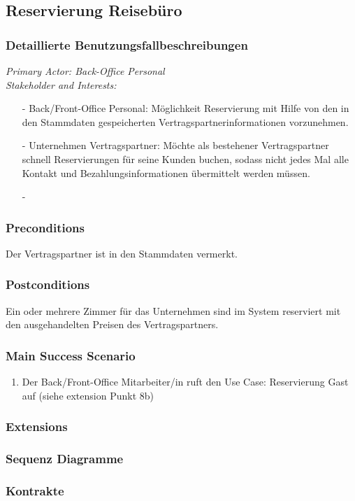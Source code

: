 \documentclass[./detailed_overview_usecases.tex]{subfiles}
\begin{document}
    \subsection{Reservierung Reisebüro}
    \subsubsection{Detaillierte Benutzungsfallbeschreibungen}

    \textit{Primary Actor: Back-Office Personal}
    \\
    \textit{Stakeholder and Interests:}
    \begin{itemize}
        \item[-] Back/Front-Office Personal: Möglichkeit Reservierung mit Hilfe von den in den Stammdaten gespeicherten Vertragspartnerinformationen vorzunehmen.
        \item[-] Unternehmen Vertragspartner: Möchte als bestehener Vertragspartner schnell Reservierungen für seine Kunden buchen, sodass nicht jedes
        Mal alle Kontakt und Bezahlungsinformationen übermittelt werden müssen.
        \item[-]
    \end{itemize}

    \subsubsection*{Preconditions}
    Der Vertragspartner ist in den Stammdaten vermerkt.

    \subsubsection*{Postconditions}
    Ein oder mehrere Zimmer für das Unternehmen sind im System reserviert mit den ausgehandelten Preisen des Vertragspartners.

    \subsubsection*{Main Success Scenario}
    \begin{enumerate}
        \item Der Back/Front-Office Mitarbeiter/in ruft den Use Case: Reservierung Gast auf (siehe extension Punkt 8b)
    \end{enumerate}

    \subsubsection*{Extensions}
    \item

    \subsubsection{Sequenz Diagramme}
    \subsubsection{Kontrakte}
\end{document}
